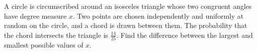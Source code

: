 A circle is circumscribed around an isosceles triangle whose two congruent angles have degree measure $x$. Two points are chosen independently and uniformly at random on the circle, and a chord is drawn between them. The probability that the chord intersects the triangle is $\frac{14}{25}$. Find the difference between the largest and smallest possible values of $x$.